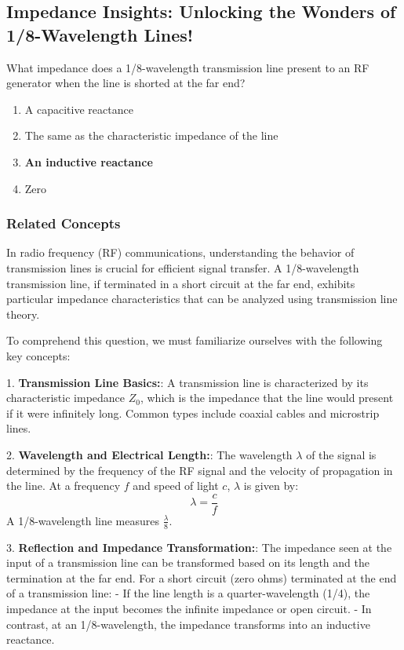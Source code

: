 \subsection{Impedance Insights: Unlocking the Wonders of 1/8-Wavelength Lines!}

\begin{tcolorbox}[colback=gray!10, colframe=black, title=E9F10] What impedance does a 1/8-wavelength transmission line present to an RF generator when the line is shorted at the far end?

\begin{enumerate}[label=\Alph*.]
    \item A capacitive reactance
    \item The same as the characteristic impedance of the line
    \item \textbf{An inductive reactance}
    \item Zero
\end{enumerate} \end{tcolorbox}

\subsubsection{Related Concepts}

In radio frequency (RF) communications, understanding the behavior of transmission lines is crucial for efficient signal transfer. A 1/8-wavelength transmission line, if terminated in a short circuit at the far end, exhibits particular impedance characteristics that can be analyzed using transmission line theory.

To comprehend this question, we must familiarize ourselves with the following key concepts:

1. \textbf{Transmission Line Basics:}: A transmission line is characterized by its characteristic impedance \( Z_0 \), which is the impedance that the line would present if it were infinitely long. Common types include coaxial cables and microstrip lines.

2. \textbf{Wavelength and Electrical Length:}: The wavelength \( \lambda \) of the signal is determined by the frequency of the RF signal and the velocity of propagation in the line. At a frequency \( f \) and speed of light \( c \), \( \lambda \) is given by:
   \[
   \lambda = \frac{c}{f}
   \]
   A 1/8-wavelength line measures \( \frac{\lambda}{8} \).

3. \textbf{Reflection and Impedance Transformation:}: The impedance seen at the input of a transmission line can be transformed based on its length and the termination at the far end. For a short circuit (zero ohms) terminated at the end of a transmission line:
   - If the line length is a quarter-wavelength (1/4), the impedance at the input becomes the infinite impedance or open circuit.
   - In contrast, at an 1/8-wavelength, the impedance transforms into an inductive reactance.

